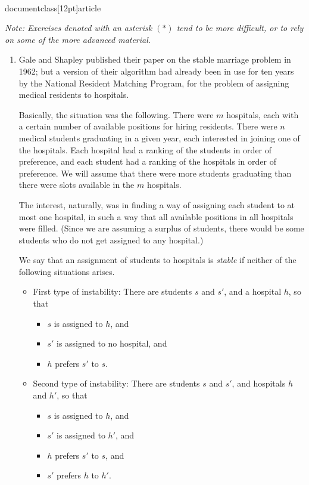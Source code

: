 \\documentclass[12pt]{article}
\begin{document}
{\em Note: Exercises denoted with an asterisk $(\ast)$
tend to be more difficult, or to rely on some of the
more advanced material.}

\begin{enumerate}

\def\A{{\cal A}}
\def\D{{\cal D}}


\item

Gale and Shapley published their paper on the
stable marriage problem in 1962; but
a version of their algorithm had already been in use for ten years
by the National Resident Matching Program, for the problem of
assigning medical residents to hospitals.

Basically, the situation was the following.
There were $m$ hospitals,
each with a certain number of available positions for hiring residents.
There were $n$ medical students
graduating in a given year,
each interested in joining one of the hospitals.
Each hospital had a ranking of the students in order of
preference, and each student had a ranking of the hospitals
in order of preference.
We will assume that there were more students graduating
than there were slots available in the $m$ hospitals.

The interest, naturally, was in finding a way of
assigning each student to at most one hospital,
in such a way that all available
positions in all hospitals were filled.
(Since we are assuming a surplus of students,
there would be some students who do not get assigned to any hospital.)

We say that an assignment of students to hospitals is {\em stable} if
neither of the following situations arises.
\begin{itemize}
\item First type of instability:
There are students $s$ and $s'$, and a hospital $h$, so that
\begin{itemize}
\item $s$ is assigned to $h$, and
\item $s'$ is assigned to no hospital, and
\item $h$ prefers $s'$ to $s$.
\end{itemize}
\item Second type of instability:
There are students $s$ and $s'$, and hospitals $h$ and $h'$, so that
\begin{itemize}
\item $s$ is assigned to $h$, and
\item $s'$ is assigned to $h'$, and
\item $h$ prefers $s'$ to $s$, and
\item $s'$ prefers $h$ to $h'$.
\end{itemize}
\end{itemize}


\end{enumerate}
\end{document}
